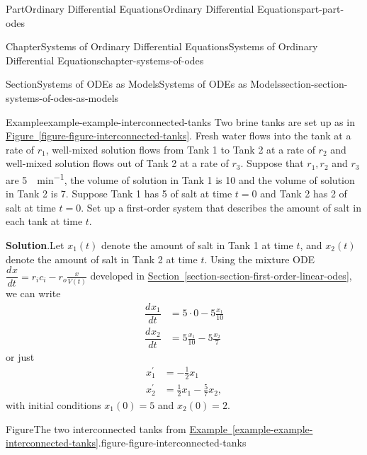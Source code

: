 \documentclass[twoside,10pt,]{book}
\newcommand{\blocktitlefont}{\relax}
\newcommand{\xreffont}{\relax}
\numberwithin{equation}{part}
\newcommand{\dv}[3][]{\dfrac{d^{#1} #2}{d #3^{#1}}}
\begin{document}
\begin{partptx}{Part}{Ordinary Differential Equations}{}{Ordinary Differential Equations}{}{}{part-part-odes}
\begin{chapterptx}{Chapter}{Systems of Ordinary Differential Equations}{}{Systems of Ordinary Differential Equations}{}{}{chapter-systems-of-odes}
\begin{sectionptx}{Section}{Systems of ODEs as Models}{}{Systems of ODEs as Models}{}{}{section-section-systems-of-odes-as-models}
\begin{example}{Example}{}{example-example-interconnected-tanks}%
Two brine tanks are set up as in \hyperref[figure-figure-interconnected-tanks]{Figure~{\xreffont\ref{figure-figure-interconnected-tanks}}}. Fresh water flows into the tank at a rate of \(r_{1}\), well-mixed solution flows from Tank 1 to Tank 2 at a rate of \(r_{2}\) and well-mixed solution flows out of Tank 2 at a rate of \(r_{3}\). Suppose that \(r_{1}, r_{2}\) and  \(r_{3}\) are \SI{5}{\gallon\per\minute}, the volume of solution in Tank 1 is \SI{10}{\gallon} and the volume of solution in Tank 2 is \SI{7}{\gallon}. Suppose Tank 1 has \SI{5}{\pound} of salt at time \(t=0\) and Tank 2 has \SI{2}{\pound} of salt at time \(t=0\). Set up a first-order system that describes the amount of salt in each tank at time \(t\).%
\par\smallskip%
\noindent\textbf{\blocktitlefont Solution}.\hypertarget{solution-example-interconnected-tanks-b}{}\quad{}Let \(x_{1}(t)\) denote the amount of salt in Tank 1 at time \(t\), and \(x_{2}(t)\) denote the amount of salt in Tank 2 at time \(t\). Using the mixture ODE \(\dv{x}{t} = r_{i}c_{i}-r_{o}\frac{x}{V(t)}\) developed in \hyperref[section-section-first-order-linear-odes]{Section~{\xreffont\ref{section-section-first-order-linear-odes}}}, we can write%
\begin{align*}
\dv{x_{1}}{t} &= 5\cdot0 - 5\frac{x_{1}}{10}\\
\dv{x_{2}}{t} &= 5\frac{x_{1}}{10}-5\frac{x_{2}}{7}
\end{align*}
or just%
\begin{align*}
x^\prime_{1}  &=  -\frac{1}{2}x_{1}\\
x^\prime_{2}  &=  \frac{1}{2}x_{1}-\frac{5}{7}x_{2},
\end{align*}
with initial conditions \(x_{1}(0) = 5\) and \(x_{2}(0) = 2\).%
\end{example}
\begin{figureptx}{Figure}{The two interconnected tanks from \hyperref[example-example-interconnected-tanks]{Example~{\xreffont\ref{example-example-interconnected-tanks}}}.}{figure-figure-interconnected-tanks}{}%
\begin{image}{0}{1}{0}{}%
\end{image}
\end{figureptx}
\end{sectionptx}
\end{chapterptx}
\end{partptx}
\end{document}
